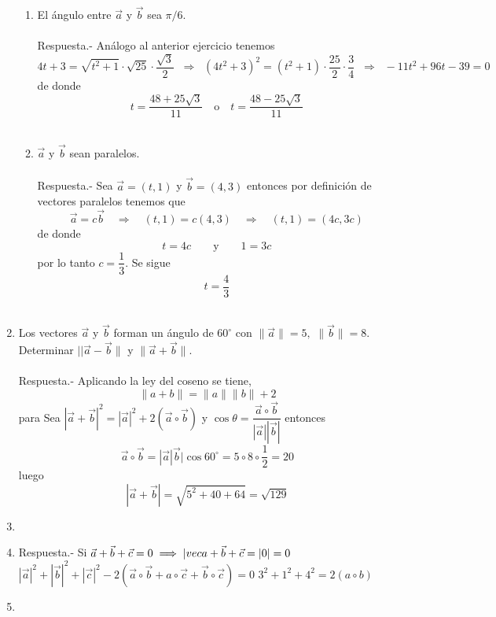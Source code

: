 \begin{enumerate}
\begin{enumerate}[\bfseries a)]
    \item El ángulo entre $\vec{a}$ y $\vec{b}$ sea $\pi/6$.\\\\
	Respuesta.-\; Análogo al anterior ejercicio tenemos $$4t+3=\sqrt{t^2+1}\cdot \sqrt{25}\cdot \dfrac{\sqrt{3}}{2}\;\; \Longrightarrow \; \; (4t^2+3)^2=(t^2+1)\cdot\dfrac{25}{2}\cdot \dfrac{3}{4}\;\; \Longrightarrow \; \; -11t^2+96t-39=0$$
	de donde $$t=\dfrac{48+25\sqrt{3}}{11} \quad \mbox{o} \quad t=\dfrac{48-25\sqrt{3}}{11}$$\\

    \item $\vec{a}$ y $\vec{b}$ sean paralelos.\\\\
	Respuesta.-\; Sea $\vec{a}=(t,1)$ y $\vec{b}=(4,3)$ entonces por definición de vectores paralelos tenemos que $$\vec{a}=c\vec{b} \quad \Longrightarrow \quad (t,1)=c(4,3) \quad \Longrightarrow \quad (t,1)=(4c,3c)$$
	de donde $$t=4c \qquad \mbox{y} \qquad 1=3c$$
	por lo tanto $c=\dfrac{1}{3}$. Se sigue $$t=\dfrac{4}{3}$$\\

\end{enumerate}

\item Los vectores $\vec{a}$ y $\vec{b}$ forman un ángulo de $60^\circ$ con $\|\vec{a}\|=5,$ $\|\vec{b}\|=8$. Determinar $||\vec{a}-\vec{b}\|$ y $\|\vec{a}+\vec{b}\|$.\\\\
    Respuesta.-\; Aplicando la ley del coseno se tiene, $$\|a+b\|=\|a\|\|b\| + 2$$  para Sea $|\vec{a}+\vec{b}|^2=|\vec{a}|^2 + 2(\vec{a}\circ \vec{b})$ y $\cos \theta = \dfrac{\vec{a}\circ \vec{b}}{|\vec{a}||\vec{b}|}$ entonces 
    $$\vec{a}\circ \vec{b}=|\vec{a}|\vec{b}|\cos 60^\circ = 5\circ 8 \circ \dfrac{1}{2}=20$$
    luego $$|\vec{a}+\vec{b}| = \sqrt{5^2+40+64} = \sqrt{129}$$

\item 

\item 
    Respuesta.-\; Si $\vec{a}+\vec{b}+\vec{c}=0 \; \Longrightarrow \; |\\vec{a}+\vec{b}+\vec{c}=|0|=0$
    $|\vec{a}|^2 + |\vec{b}|^2+|\vec{c}|^2 - 2(\vec{a}\circ \vec{b}+a\circ \vec{c}+\vec{b}\circ \vec{c})=0$
    $3^2 + 1^2 + 4^2 = 2(a\circ b)$

\item


\end{enumerate}
